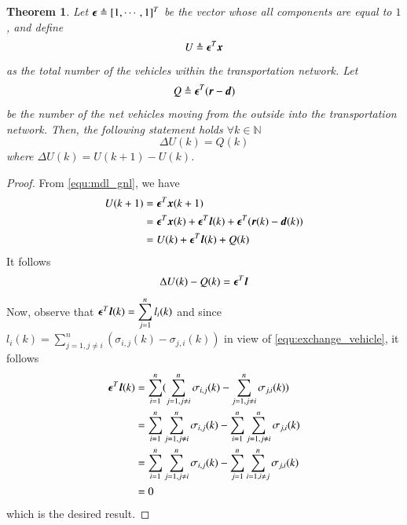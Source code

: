 \documentclass[preprint,authoryear,12pt]{elsarticle}
\renewcommand{\vec}[1]{\mbox{\boldmath$#1$}}
\newtheorem{thm}{Theorem}
\begin{document}
\begin{thm}\label{thm:conservation}
Let $\vec{\epsilon} \triangleq [1,\cdots,1]^T$ be the vector whose all components are equal to $1$, and 
 define
\begin{equation}\label{equ:total_vehicle}
U \triangleq \vec{\epsilon}^T\vec{x}
\end{equation}
as the total number of the vehicles within the transportation network. Let
\begin{equation}\label{equ:all_io}
Q \triangleq \vec{\epsilon}^T(\vec{r}-\vec{d})
\end{equation}
be the number of the net vehicles moving from the outside into the transportation network. Then, the following statement holds $\forall k\in\mathbb{N}$
\begin{equation}\label{equ:conservation}
\Delta U(k) = Q(k)
\end{equation}
where $\Delta U(k)=U(k+1)-U(k)$.
\end{thm}
\begin{proof}
From \eqref{equ:mdl_gnl}, we have
\begin{align*}
U(k+1) &= \vec{\epsilon}^T\vec{x}(k+1)\\
       &=
\vec{\epsilon}^T\vec{x}(k)+\vec{\epsilon}^T\vec{l}(k)+\vec{\epsilon}
^T(\vec{r}(k)-\vec{d}(k))\\
       &= U(k)+\vec{\epsilon}^T\vec{l}(k)+Q(k)
\end{align*}
It follows
$$\Delta U(k)-Q(k) = \vec{\epsilon}^T\vec{l}$$
Now, observe that $\vec{\epsilon}^T\vec{l}(k) =\displaystyle \sum_{j=1}^{n} l_i(k)$ and since $l_i(k)=\displaystyle\sum_{j=1,j\neq i}^{n}(\sigma_{i,j}(k)-\sigma_{j,i}(k))$ in view of \eqref{equ:exchange_vehicle}, it follows
\begin{align*}
\vec{\epsilon}^T\vec{l}(k)
    &= \sum_{i=1}^n (\sum_{j=1,j\neq i}^{n} \sigma_{i,j}(k)
       -\sum_{j=1,j\neq i}^{n} \sigma_{j,i}(k))\\
    &= \sum_{i=1}^n \sum_{j=1,j\neq i}^{n} \sigma_{i,j}(k)
       -\sum_{i=1}^n \sum_{j=1,j\neq i}^{n} \sigma_{j,i}(k)\\
    &= \sum_{i=1}^n \sum_{j=1,j\neq i}^{n} \sigma_{i,j}(k)
       -\sum_{j=1}^n \sum_{i=1,i\neq j}^{n} \sigma_{j,i}(k)\\
    &= 0
\end{align*}
which is the desired result.
\end{proof}
\end{document}
